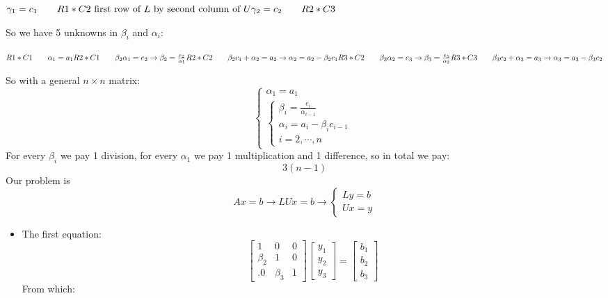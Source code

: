 \begin{itemize}
        $
        \gamma_1=c_1\qquad R1*C2\text{ first row of $L$ by second column of $U$}\\
        \gamma_2=c_2\qquad R2*C3
        $
        
        \vspace{1em}
        So we have 5 unknowns in $\beta_i$ and $\alpha_i$:
        
        $
        R1*C1\qquad\alpha_1=a_1\qquad\\
        R2*C1\qquad\beta_2\alpha_1=e_2\rightarrow\beta_2=\frac{e_2}{\alpha_1}\\
        R2*C2\qquad\beta_2c_1+\alpha_2=a_2\rightarrow\alpha_2=a_2-\beta_2c_1\\
        R3*C2\qquad\beta_3\alpha_2=e_3\rightarrow\beta_3=\frac{e_3}{\alpha_2}\\
        R3*C3\qquad\beta_3c_2+\alpha_3=a_3\rightarrow\alpha_3=a_3-\beta_3c_2        
        $

        \vspace{1em}
        So with a general $n\times n$ matrix:
        $$
        \begin{cases}
            \alpha_1=a_1\\
            \begin{cases}
                \beta_i=\frac{e_i}{\alpha_{i-1}}\\
                \alpha_i=a_i-\beta_ic_{i-1}\\
                i=2,\cdots,n                        
            \end{cases}            
        \end{cases}
        $$
        For every $\beta_i$ we pay 1 division, for every $\alpha_1$ we pay 1 multiplication and 1 difference, so in total we pay:
        $$3(n-1)$$
        Our problem is
        $$
        Ax=b\rightarrow LUx=b
        \rightarrow\begin{cases}
            Ly=b\\
            Ux=y
        \end{cases}
        $$
        \begin{itemize}
            \item The first equation:
            $$
            \begin{bmatrix}
                1 & 0 & 0\\
                \beta_2 & 1 & 0\\
                .0 & \beta_3 & 1
            \end{bmatrix}
            \begin{bmatrix}
                y_1\\
                y_2\\
                y_3
            \end{bmatrix}=
            \begin{bmatrix}
                b_1\\
                b_2\\
                b_3
            \end{bmatrix}
            $$
            From which:


\end{itemize}
\end{itemize}

